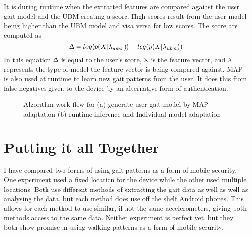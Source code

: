 \documentclass{sig-alternate}
\begin{document}
	It is during runtime when the extracted features are compared against the user gait model and the UBM creating a score. High scores result from the user model being higher than the UBM model and visa versa for low scores. The score are computed as \begin{equation}
	\Updelta = log(p(X|\lambda_{user})) - log(p(X|\lambda_{ubm}))
	\end{equation}
In this equation \begin{math} \Updelta \end{math} is equal to the user's score, X is the feature vector, and \begin{math} \lambda \end{math} represents the type of model the feature vector is being compared against. MAP is also used at runtime to learn new gait patterns from the user. It does this from false negatives given to the device by an alternative form of authentication. 

\begin{figure}
\centering
{}
\caption{Algorithm work-flow for (a) generate user gait model by MAP adaptation (b) runtime inference and Individual model adaptation}
\label{fig:TD2}
\end{figure}



\section{Putting it all Together}
	I have compared two forms of using gait patterns as a form of mobile security. One experiment used a fixed location for the device while the other used multiple locations. Both use different methods of extracting the gait data as well as well as analysing the data, but each method does use off the shelf Android phones. This allows for each method to use similar, if not the same accelerometers, giving both methods access to the same data. Neither experiment is perfect yet, but they both show promise in using walking patterns as a form of mobile security.
	
\end{document}
